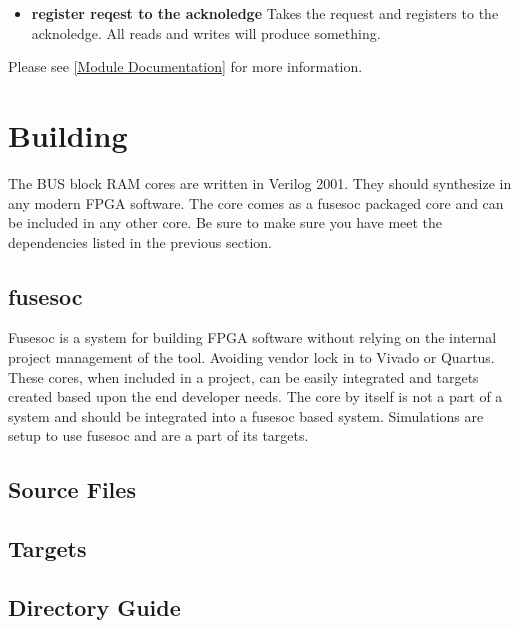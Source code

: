 \begin{itemize}
\item \textbf{register reqest to the acknoledge} Takes the request and registers to the acknoledge. All reads and writes will produce something.
\end{itemize}

Please see \ref{Module Documentation} for more information.

\section{Building}

\par
The BUS block RAM cores are written in Verilog 2001. They should synthesize in any modern FPGA software. The core comes as a fusesoc packaged core and can be
included in any other core. Be sure to make sure you have meet the dependencies listed in the previous section.

\subsection{fusesoc}
\par
Fusesoc is a system for building FPGA software without relying on the internal project management of the tool. Avoiding vendor lock in to Vivado or Quartus.
These cores, when included in a project, can be easily integrated and targets created based upon the end developer needs. The core by itself is not a part of
a system and should be integrated into a fusesoc based system. Simulations are setup to use fusesoc and are a part of its targets.

\subsection{Source Files}





\subsection{Targets}





\subsection{Directory Guide}


